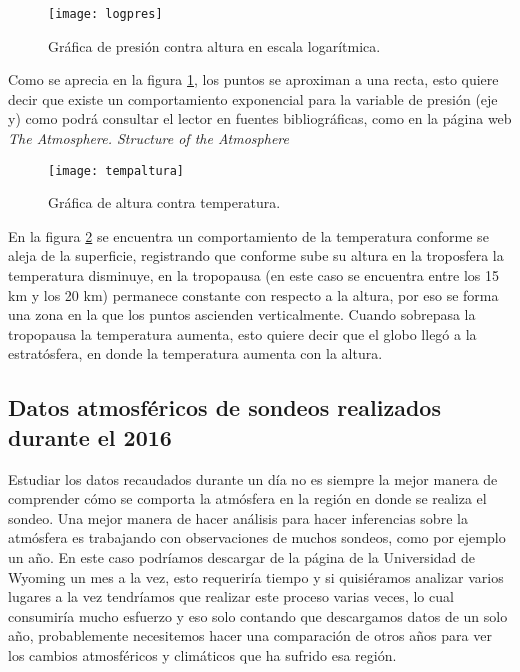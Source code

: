 \documentclass[12pt]{article}
\begin{document}
\pagebreak

\begin{figure}[ht]
\centering

\texttt{[image: logpres]}

\caption{Gráfica de presión contra altura en escala logarítmica.}

\label{fig:logp}

\end{figure}

Como se aprecia en la figura \ref{fig:logp}, los puntos se aproximan a una recta, esto quiere decir que existe un comportamiento exponencial para la variable de presión (eje y) como podrá consultar el lector en fuentes bibliográficas, como en la página web \emph{The Atmosphere. Structure of the Atmosphere} \cite{ncsu}

\begin{figure}[ht!]
\centering
\texttt{[image: tempaltura]}
\caption{Gráfica de altura contra temperatura.}
\label{fig:tempal}
\end{figure}
En la figura \ref{fig:tempal} se encuentra un comportamiento de la temperatura conforme se aleja de la superficie, registrando que conforme sube su altura en la troposfera la temperatura disminuye, en la tropopausa (en este caso se encuentra entre los 15 km y los 20 km) permanece constante con respecto a la altura, por eso se forma una zona en la que los puntos ascienden verticalmente. Cuando sobrepasa la tropopausa la temperatura aumenta, esto quiere decir que el globo llegó a la estratósfera, en donde la temperatura aumenta con la altura.\cite{ncsu}

\subsection{Datos atmosféricos de sondeos realizados durante el 2016}

Estudiar los datos recaudados durante un día no es siempre la mejor manera de comprender cómo se comporta la atmósfera en la región en donde se realiza el sondeo. Una mejor manera de hacer análisis para hacer inferencias sobre la atmósfera es trabajando con observaciones de muchos sondeos, como por ejemplo un año. En este caso podríamos descargar de la página de la Universidad de Wyoming un mes a la vez, esto requeriría tiempo y si quisiéramos analizar varios lugares a la vez tendríamos que realizar este proceso varias veces, lo cual consumiría mucho esfuerzo y eso solo contando que descargamos datos de un solo año, probablemente necesitemos hacer una comparación de otros años para ver los cambios atmosféricos y climáticos que ha sufrido esa región.
\end{document}
